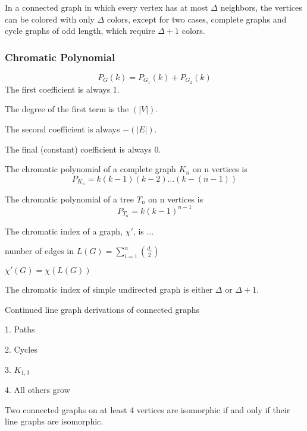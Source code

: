 

\begin{theorem}
    In a connected graph in which every vertex has at most $\Delta$ neighbors, the vertices can be colored with only $\Delta$ colors, except for two cases, complete graphs and cycle graphs of odd length, which require $\Delta+1$ colors.
\end{theorem}

\subsubsection{Chromatic Polynomial}
\[
    P_G (k) = P_{G_1} (k) + P_{G_2} (k) 
\]
The first coefficient is always 1.

The degree of the first term is the $(|V|)$.

The second coefficient is always $-(|E|)$.

The final (constant) coefficient is always 0.

\begin{definition}
    The chromatic polynomial of a complete graph $K_n$ on n vertices is 
    \[P_{K_n}=k(k-1)(k-2)...(k-(n-1))\]
\end{definition}

\begin{definition}
    The chromatic polynomial of a tree $T_n$ on n vertices is \[P_{T_n}=k(k-1)^{n-1}\]
\end{definition}



\begin{definition}
    The chromatic index of a graph, $\chi'$, is ...
\end{definition}

    number of edges in $L(G) = \sum_{i=1}^n{\binom{d_i}{2}}$

\begin{theorem}
    $\chi'(G) = \chi(L(G))$
\end{theorem}

\begin{theorem}
     The chromatic index of simple undirected graph is either $\Delta$ or $\Delta + 1$.
\end{theorem}

\begin{theorem}
\end{theorem}

Continued line graph derivations of connected graphs

    1.  Paths

    2.  Cycles

    3.  $K_{1,3}$

    4.  All others grow

\begin{theorem}
    Two connected graphs on at least 4 vertices are isomorphic if and only if their line graphs are isomorphic.
\end{theorem}
